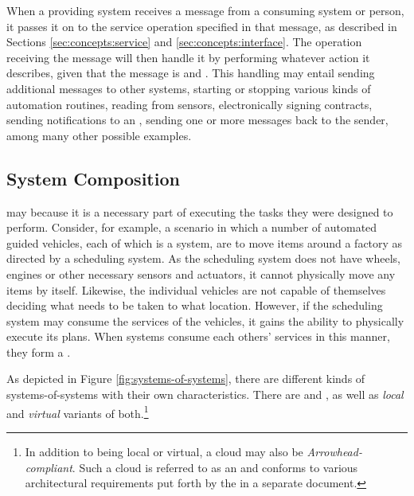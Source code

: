 When a providing system receives a message from a consuming system or person, it passes it on to the service operation specified in that message, as described in Sections \ref{sec:concepts:service} and \ref{sec:concepts:interface}.
The operation receiving the message will then handle it by performing whatever action it describes, given that the message is  and .
This handling may entail sending additional messages to other systems, starting or stopping various kinds of automation routines, reading from sensors, electronically signing contracts, sending notifications to an , sending one or more messages back to the sender, among many other possible examples.

\subsection{System Composition}
\label{sec:overview:system-composition}

 may  because it is a necessary part of executing the tasks they were designed to perform.
Consider, for example, a scenario in which a number of automated guided vehicles, each of which is a system, are to move items around a factory as directed by a scheduling system.
As the scheduling system does not have wheels, engines or other necessary sensors and actuators, it cannot physically move any items by itself. 
Likewise, the individual vehicles are not capable of themselves deciding what needs to be taken to what location.
However, if the scheduling system may consume the services of the vehicles, it gains the ability to physically execute its plans.
When systems consume each others' services in this manner, they form a .

As depicted in Figure \ref{fig:systems-of-systems}, there are different kinds of systems-of-systems with their own characteristics.
There are  and , as well as \textit{local} and \textit{virtual} variants of both.\footnote{
  In addition to being local or virtual, a cloud may also be \textit{Arrowhead-compliant}.
  Such a cloud is referred to as an  and conforms to various architectural requirements put forth by the  in a separate document.
}

